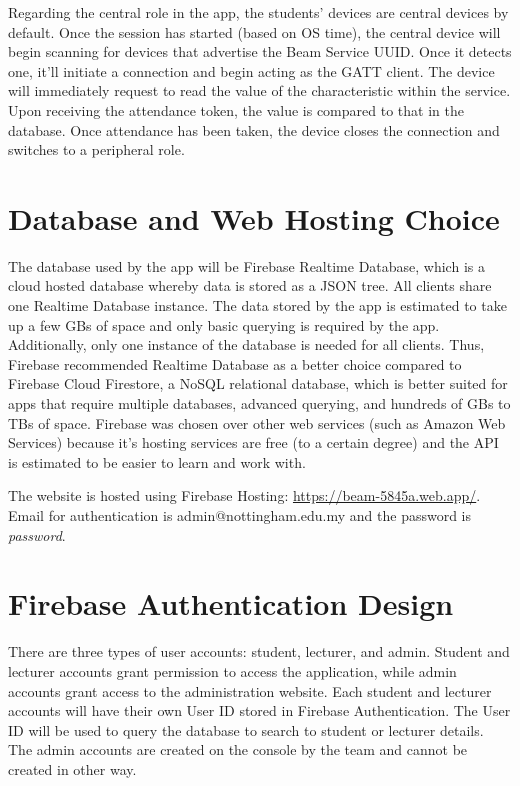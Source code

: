 \documentclass[../report.tex]{subfiles}
\begin{document}
Regarding the central role in the app, the students’ devices are central devices by default. Once the session has started (based on OS time), the central device will begin scanning for devices that advertise the Beam Service UUID. Once it detects one, it’ll initiate a connection and begin acting as the GATT client. The device will immediately request to read the value of the characteristic within the service. Upon receiving the attendance token, the value is compared to that in the database. Once attendance has been taken, the device closes the connection and switches to a peripheral role.

\section{Database and Web Hosting Choice}
The database used by the app will be Firebase Realtime Database, which is a cloud hosted database whereby data is stored as a JSON tree. All clients share one Realtime Database instance. The data stored by the app is estimated to take up a few GBs of space and only basic querying is required by the app. Additionally, only one instance of the database is needed for all clients. Thus, Firebase recommended Realtime Database as a better choice compared to Firebase Cloud Firestore, a NoSQL relational database, which is better suited for apps that require multiple databases, advanced querying, and hundreds of GBs to TBs of space. Firebase was chosen over other web services (such as Amazon Web Services) because it’s hosting services are free (to a certain degree) and the API is estimated to be easier to learn and work with.

The website is hosted using Firebase Hosting: \url{https://beam-5845a.web.app/}. Email for authentication is admin@nottingham.edu.my and the password is \textit{password}.

\section{Firebase Authentication Design}
There are three types of user accounts: student, lecturer, and admin. Student and lecturer accounts grant permission to access the application, while admin accounts grant access to the administration website. Each student and lecturer accounts will have their own User ID stored in Firebase Authentication. The User ID will be used to query the database to search to student or lecturer details. The admin accounts are created on the console by the team and cannot be created in other way.
\end{document}
